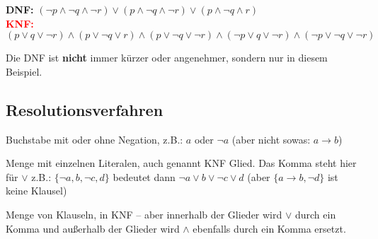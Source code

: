 \documentclass[
    ngerman,
    color=3b,
    summary,
    boxarc,
    main,
    fleqn,
    leqno,
]{rubos-tuda-template}
\begin{document}
    \textcolor{green!80!black}{\textbf{DNF:}} $(\lnot p\land \lnot q\land \lnot r)\lor(p\land \lnot q\land \lnot r)\lor(p\land \lnot q\land r)$\\
    \textcolor{red}{\textbf{KNF:}} $(p\lor q\lor\lnot r)\land(p\lor \lnot q\lor r)\land(p\lor \lnot q\lor \lnot r)\land(\lnot p\lor q\lor \lnot r)\land(\lnot p\lor \lnot q\lor \lnot r)$
    \begin{anmerkung}
        Die DNF ist \textbf{nicht} immer kürzer oder angenehmer, sondern nur in diesem Beispiel.
    \end{anmerkung}
    \clearpage
    \subsection{Resolutionsverfahren}
    \begin{definition}[Literal]
        Buchstabe mit oder ohne Negation, z.B.: $a$ oder $\lnot a$ (aber nicht sowas: $a\rightarrow{}b$)
    \end{definition}
    \begin{definition}[Klausel]
        Menge mit einzelnen Literalen, auch genannt KNF Glied. Das Komma steht hier für $\lor$ z.B.: 
        $\{\lnot a, b,\lnot c, d\}$ bedeutet dann $\lnot a\lor b\lor\lnot c\lor d$ (aber $\{a\rightarrow{}b,\lnot d\}$ ist keine Klausel)
    \end{definition}
    \begin{definition}[Klauselmenge]
        Menge von Klauseln, in KNF -- aber innerhalb der Glieder wird $\lor$ durch ein Komma und außerhalb der Glieder wird $\land$ ebenfalls durch ein Komma ersetzt.
    \end{definition}
\end{document}
